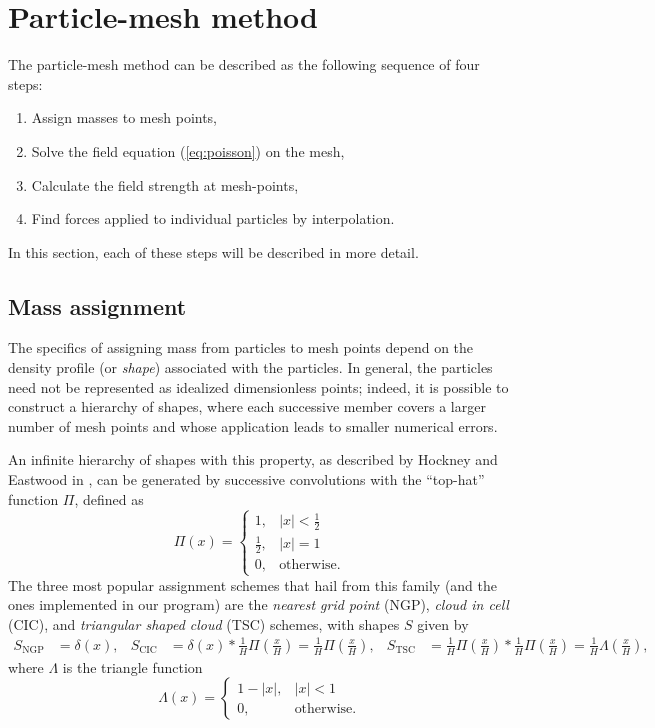 \section{Particle-mesh method}
The particle-mesh method can be described as the following sequence of four steps:
\begin{enumerate}
    \item Assign masses to mesh points,
    \item Solve the field equation (\autoref{eq:poisson}) on the mesh,
    \item Calculate the field strength at mesh-points,
    \item Find forces applied to individual particles by interpolation.
\end{enumerate}
In this section, each of these steps will be described in more detail.

\subsection{Mass assignment}\label{subsec:mass-assignment}
The specifics of assigning mass from particles to mesh points depend on the density profile (or \textit{shape}) associated with the particles.
In general, the particles need not be represented as idealized dimensionless points;
indeed, it is possible to construct a hierarchy of shapes, where each successive member covers a larger number of mesh points and whose application leads to smaller numerical errors.

An infinite hierarchy of shapes with this property, as described by Hockney and Eastwood in \cite{Hockney1988}, can be generated by successive convolutions with the ``top-hat'' function $\Pi$, defined as
\begin{equation*}
    \Pi(x) = \begin{cases}
        1,           & |x| < \frac{1}{2} \\
        \frac{1}{2}, & |x| = 1           \\
        0,           & \text{otherwise}.
    \end{cases}
\end{equation*}
The three most popular assignment schemes that hail from this family (and the ones implemented in our program) are the \textit{nearest grid point} (NGP), \textit{cloud in cell} (CIC), and \textit{triangular shaped cloud} (TSC) schemes, with shapes $S$ given by
\begin{align*}
    S_\text{NGP} & = \delta(x), & S_\text{CIC} & = \delta(x) * \frac{1}{H} \Pi\left(\frac{x}{H}\right) = \frac{1}{H}\Pi\left(\frac{x}{H}\right), & S_\text{TSC} & = \frac{1}{H}\Pi\left(\frac{x}{H}\right) * \frac{1}{H}\Pi\left(\frac{x}{H}\right) = \frac{1}{H}\Lambda \left(\frac{x}{H}\right),
\end{align*}
where $\Lambda$ is the triangle function
\begin{equation*}
    \Lambda(x) = \begin{cases}
        1 - |x|, & |x| < 1           \\
        0,       & \text{otherwise}.
    \end{cases}
\end{equation*}

